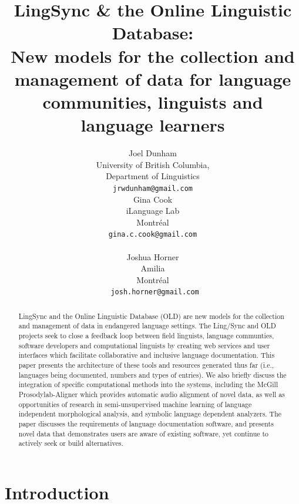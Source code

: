 \documentclass[11pt]{article}
\title{LingSync \& the Online Linguistic Database:\\New models for the
    collection and management of data for language communities, linguists and
language learners}
\author{Joel Dunham \\
University of British Columbia,   \\
Department of Linguistics \\
{\tt jrwdunham@gmail.com} \\\And
Gina Cook \\
iLanguage Lab \\
Montr\'eal \\
{\tt gina.c.cook@gmail.com} \\  \\\And
Joshua Horner \\
Amilia  \\
Montr\'eal \\
{\tt ~josh.horner@gmail.com} \\ }
\date{}
\begin{document}
\maketitle

\begin{abstract}
LingSync and the Online Linguistic Database (OLD) are new models for the
collection and management of data in endangered language settings. The
Ling\-/Sync and OLD projects seek to close a feedback loop  between field linguists, language communties, software developers and computational linguists  by creating web services and user interfaces which facilitate
collaborative and inclusive language documentation. This paper presents the
architecture of these tools and resources generated thus far (i.e., languages
being documented, numbers and types of entries). We also briefly discuss the
integration of specific computational methods into the systems, including the 
McGill Prosodylab-Aligner which provides automatic audio
alignment of novel data, as well as opportunities of research in semi-unsupervised machine learning of  language
independent morphological analysis, and symbolic language dependent analyzers. 
The paper discusses the requirements of language documentation software, and presents novel data that demonstrates users are aware of existing software, yet continue to actively seek or build alternatives.
\end{abstract}



\section{Introduction}
\end{document}
